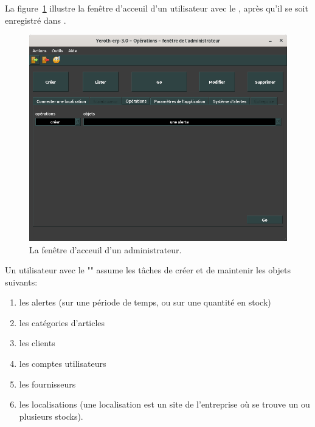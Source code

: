 \label{sec:utilisateurs-ladministrateur}

La figure~\ref{fig:fenetre-principale-admin} illustre la
fen\^etre d'acceuil d'un utilisateur avec le \role \admin,
apr\`es qu'il se soit enregistr\'e dans \yeren.\\

\begin{figure}[!htbp]
\centering
\includegraphics[scale=0.63]{images/yeroth-fenetre-administrateur.png}
\caption{La fen\^etre d'acceuil d'un administrateur.}
\label{fig:fenetre-principale-admin}
\end{figure}

Un utilisateur avec le \role "\admin" assume les
t\^aches de cr\'eer et de maintenir les objets suivants:
\begin{enumerate}[1)]
	\item les alertes (sur une p\'eriode de temps, ou sur une quantit\'e en stock)
	\item les cat\'egories d'articles
	\item les clients
	\item les comptes utilisateurs
	\item les fournisseurs				
	\item les localisations (une localisation est un site de
	      l'entreprise o\`u se trouve un ou plusieurs stocks).\\   
\end{enumerate}
